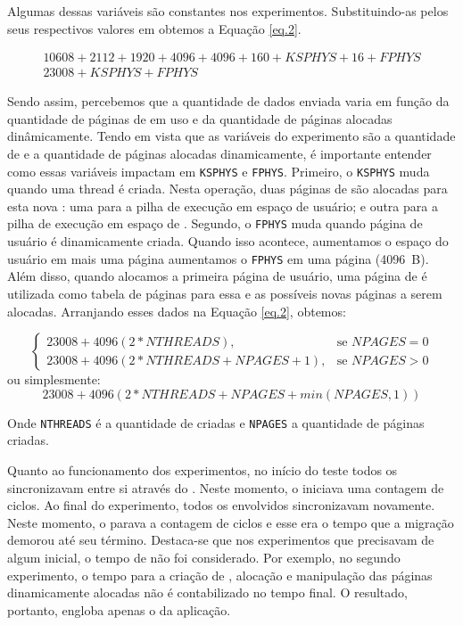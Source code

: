 Algumas dessas variáveis são constantes nos experimentos. Substituindo-as pelos seus respectivos valores em \bytes obtemos a Equação \ref{eq.2}.

\begin{gather}
    10608 + 2112 + 1920 + 4096 + 4096 + 160 + KSPHYS + 16 + FPHYS\\
    23008 + KSPHYS + FPHYS\label{eq.2}
\end{gather}

Sendo assim, percebemos que a quantidade de dados enviada varia em função da quantidade de páginas de  em uso e da quantidade de páginas alocadas dinâmicamente. Tendo em vista que as variáveis do experimento são a quantidade de \threads e a quantidade de páginas alocadas dinamicamente, é importante entender como essas variáveis impactam em \texttt{KSPHYS} e \texttt{FPHYS}. Primeiro, o \texttt{KSPHYS} muda quando uma thread é criada. Nesta operação, duas páginas de  são alocadas para esta nova \thread: uma para a pilha de execução em espaço de usuário; e outra para a pilha de execução em espaço de . Segundo, o \texttt{FPHYS} muda quando página de usuário é dinamicamente criada. Quando isso acontece, aumentamos o espaço do usuário em mais uma página \ie aumentamos o \texttt{FPHYS} em uma página (4096~B). Além disso, quando alocamos a primeira página de usuário, uma página de  é utilizada como tabela de páginas para essa e as possíveis novas páginas a serem alocadas. Arranjando esses dados na Equação \ref{eq.2}, obtemos:

\[
\begin{cases}
    23008 + 4096(2*NTHREADS),& \text{se } NPAGES= 0\\
    23008 + 4096(2*NTHREADS + NPAGES + 1),& \text{se } NPAGES > 0
\end{cases}
\]
ou simplesmente:
\begin{equation}\label{eq.3}
    23008 + 4096(2*NTHREADS + NPAGES + min(NPAGES, 1))
\end{equation}

Onde \texttt{NTHREADS} é a quantidade de \threads criadas e \texttt{NPAGES} a quantidade de páginas criadas.


Quanto ao funcionamento dos experimentos, no início do teste todos os \clusters sincronizavam entre si através do \sync. Neste momento, o \iocluster iniciava uma contagem de ciclos. Ao final do experimento, todos os \clusters envolvidos sincronizavam novamente. Neste momento, o \iocluster parava a contagem de ciclos e esse era o tempo que a migração demorou até seu término. Destaca-se que nos experimentos que precisavam de algum \setup inicial, o tempo de \setup não foi considerado. Por exemplo, no segundo experimento, o tempo para a criação de \threads, alocação e manipulação das páginas dinamicamente alocadas não é contabilizado no tempo final. O resultado, portanto, engloba apenas o \downtime da aplicação.




